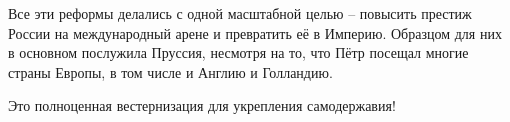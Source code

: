 \documentclass[12pt]{article}
\begin{document}
  Все эти реформы делались с одной масштабной целью --
  повысить престиж России на международный арене и превратить её в Империю.
  Образцом для них в основном послужила Пруссия, несмотря на то, что
  Пётр посещал многие страны Европы, в том числе и Англию и Голландию.

  Это полноценная вестернизация для укрепления самодержавия!

\end{document}
